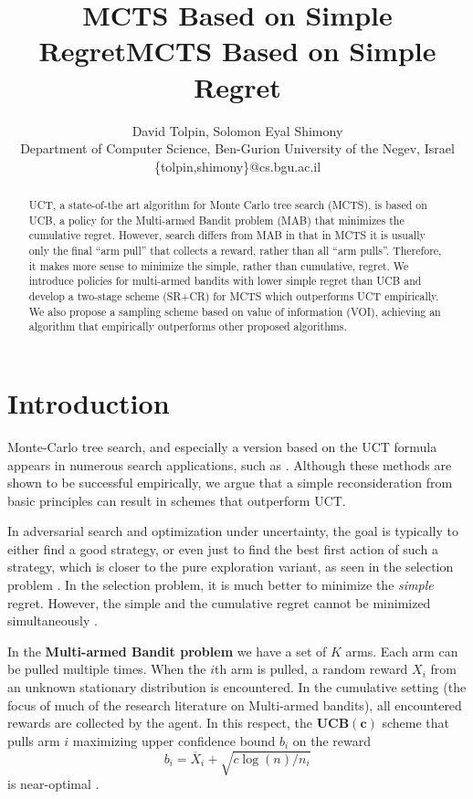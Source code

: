 \documentclass[letterpaper]{article}
\title{MCTS Based on Simple Regret}
\author {David Tolpin, Solomon Eyal Shimony \\
Department of Computer Science, Ben-Gurion University of the Negev, Israel \\
\{tolpin,shimony\}@cs.bgu.ac.il}
\title{MCTS Based on Simple Regret}
\begin{document}
\maketitle

\begin{abstract}
UCT, a state-of-the art algorithm for Monte Carlo tree search (MCTS),
is based on UCB, a policy for the Multi-armed Bandit problem (MAB) that 
minimizes the cumulative regret.  However, search differs from MAB in
that in MCTS it is usually only the final ``arm pull''
that collects a reward, rather than all ``arm pulls''.
Therefore, it makes more sense to minimize the simple, rather than
cumulative, regret. We  introduce policies for
multi-armed bandits with lower simple
regret than UCB and develop a two-stage scheme (SR+CR) for MCTS
which outperforms UCT empirically. We also propose a sampling
scheme based on value of information (VOI), achieving an algorithm
that empirically outperforms other proposed algorithms.
\end{abstract}

\section{Introduction}

Monte-Carlo tree search, and especially a version based on the UCT
formula \cite{Kocsis.uct} appears in numerous search applications,
such as \cite{GellyWang.mogo,Eyerich.ctp}. Although these methods are
shown to be successful empirically, we argue that a simple
reconsideration from basic principles can result in schemes that
outperform UCT.

In adversarial search and optimization under uncertainty, the goal is
typically to either find a good strategy, or even just to
find the best first action of such a strategy, which is closer to the pure
exploration variant, as seen in the selection problem
\cite{Bubeck.pure,TolpinShimony.blinkered}. In the selection problem,
it is much better to minimize the \emph{simple} regret.  However, the
simple and the cumulative regret cannot be minimized
simultaneously \cite{Bubeck.pure}.

In the {\bf Multi-armed Bandit problem} \cite{Vermorel.bandits} we have a set
of $K$ arms. Each arm can
be pulled multiple times. When the $i$th arm
is pulled, a random reward $X_i$ from an unknown stationary
distribution is encountered.
In the cumulative setting (the focus of much of the research literature on Multi-armed bandits),
all encountered rewards are collected by the agent. 
In this respect, the $\mathbf{UCB(c)}$ scheme that pulls arm $i$ maximizing
upper confidence bound $b_i$ on the reward 
\begin{equation}
b_i=\overline X_i+\sqrt {{c \log (n)} / {n_i}}
\label{eqn:ucb}
\end{equation}
is near-optimal \cite{Auer.ucb}.
\end{document}
